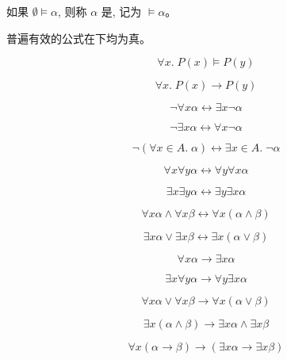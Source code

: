 \begin{frame}{}
  \begin{definition}
    如果 $\emptyset \models \alpha$, 则称 $\alpha$ 是,
    记为 $\models \alpha$。
  \end{definition}

  \vspace{0.60cm}
  \begin{center}
    普遍有效的公式在下均为真。

    \[
      \forall x.\; P(x) \models P(y)
    \]

    \[
      \forall x.\; P(x) \to P(y)
    \]
  \end{center}
\end{frame}

\begin{frame}{}
  \[
    \lnot \forall x \alpha \leftrightarrow \exists x \lnot \alpha
  \]

  \[
    \lnot \exists x \alpha \leftrightarrow \forall x \lnot \alpha
  \]

  \[
    \lnot (\forall x \in A.\; \alpha) \leftrightarrow \exists x \in A.\; \lnot \alpha
  \]
\end{frame}

\begin{frame}{}
  \[
    \forall x \forall y \alpha \leftrightarrow \forall y \forall x \alpha
  \]

  \[
    \exists x \exists y \alpha \leftrightarrow \exists y \exists x \alpha
  \]
\end{frame}

\begin{frame}{}
  \[
    \forall x \alpha \land \forall x \beta
      \leftrightarrow \forall x (\alpha \land \beta)
  \]

  \[
    \exists x \alpha \lor \exists x \beta
      \leftrightarrow \exists x (\alpha \lor \beta)
  \]
\end{frame}

\begin{frame}{}
  \[
    \forall x \alpha \to \exists x \alpha
  \]

  \[
    \exists x \forall y \alpha \to \forall y \exists x \alpha
  \]

  \pause
  \[
    \forall x \alpha \lor \forall x \beta \to \forall x (\alpha \lor \beta)
  \]

  \[
    \exists x (\alpha \land \beta) \to \exists x \alpha \land \exists x \beta
  \]

  \pause
  \[
    \forall x (\alpha \to \beta) \to (\exists x \alpha \to \exists x \beta)
  \]
\end{frame}

